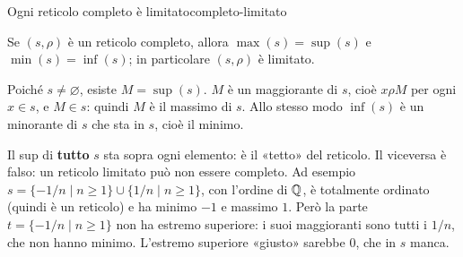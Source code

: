 \begin{concetto}
\begin{Proposizione}{Ogni reticolo completo è limitato}{completo-limitato}
    \begin{prerequisiti}
    \end{prerequisiti}
    Se $(s, \rho)$ è un reticolo completo, allora $\max(s) = \sup(s)$ e $\min(s) = \inf(s)$; in particolare $(s, \rho)$ è limitato.
\end{Proposizione}
\begin{dimostrazione}
    Poiché $s \neq \varnothing$, esiste $M = \sup(s)$. $M$ è un maggiorante di $s$, cioè $x \rho M$ per ogni $x \in s$, e $M \in s$: quindi $M$ è il massimo di
    $s$. Allo stesso modo $\inf(s)$ è un minorante di $s$ che sta in $s$, cioè il minimo.
\end{dimostrazione}
\end{concetto}

\begin{spiegazione}
    Il sup di \textbf{tutto} $s$ sta sopra ogni elemento: è il «tetto» del reticolo. Il viceversa è falso: un reticolo limitato può non essere
    completo. Ad esempio $s = \{-1/n \mid n \geq 1\} \cup \{1/n \mid n \geq 1\}$, con l'ordine di $\mathbb{Q}$, è totalmente ordinato (quindi è un reticolo)
    e ha minimo $-1$ e massimo $1$. Però la parte $t = \{-1/n \mid n \geq 1\}$ non ha estremo superiore: i suoi maggioranti sono tutti i $1/n$, che
    non hanno minimo. L'estremo superiore «giusto» sarebbe $0$, che in $s$ manca.
    \begin{center}
    \end{center}
\end{spiegazione}

